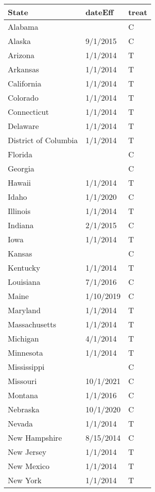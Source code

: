 \begin{table}[ht]
\centering
\begingroup\footnotesize
\begin{tabular}{lll}
  \hline
State & dateEff & treat \\ 
  \hline
Alabama &  & C \\ 
  Alaska & 9/1/2015 & C \\ 
  Arizona & 1/1/2014 & T \\ 
  Arkansas & 1/1/2014 & T \\ 
  California & 1/1/2014 & T \\ 
  Colorado & 1/1/2014 & T \\ 
  Connecticut & 1/1/2014 & T \\ 
  Delaware & 1/1/2014 & T \\ 
  District of Columbia & 1/1/2014 & T \\ 
  Florida &  & C \\ 
  Georgia &  & C \\ 
  Hawaii & 1/1/2014 & T \\ 
  Idaho & 1/1/2020 & C \\ 
  Illinois & 1/1/2014 & T \\ 
  Indiana & 2/1/2015 & C \\ 
  Iowa & 1/1/2014 & T \\ 
  Kansas &  & C \\ 
  Kentucky & 1/1/2014 & T \\ 
  Louisiana & 7/1/2016 & C \\ 
  Maine & 1/10/2019 & C \\ 
  Maryland & 1/1/2014 & T \\ 
  Massachusetts & 1/1/2014 & T \\ 
  Michigan & 4/1/2014 & T \\ 
  Minnesota & 1/1/2014 & T \\ 
  Mississippi &  & C \\ 
  Missouri & 10/1/2021 & C \\ 
  Montana & 1/1/2016 & C \\ 
  Nebraska & 10/1/2020 & C \\ 
  Nevada & 1/1/2014 & T \\ 
  New Hampshire & 8/15/2014 & C \\ 
  New Jersey & 1/1/2014 & T \\ 
  New Mexico & 1/1/2014 & T \\ 
  New York & 1/1/2014 & T \\ 

\end{tabular}
\end{table}
